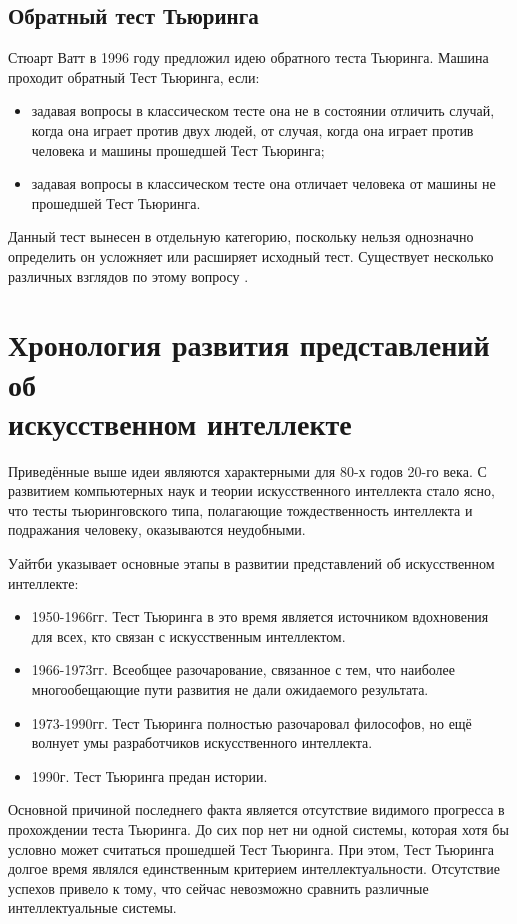 \documentclass[a4paper,14pt]{scrartcl}
\begin{document}
\subsection{Обратный тест Тьюринга}

Стюарт Ватт в 1996 году предложил идею обратного теста Тьюринга. Машина  проходит обратный Тест Тьюринга, если:
\begin{itemize}
  \item задавая вопросы в классическом тесте она не в состоянии отличить случай, когда она играет против двух людей, от случая, когда она играет против человека и машины прошедшей Тест Тьюринга;
  \item задавая вопросы в классическом тесте она отличает человека от машины не прошедшей Тест Тьюринга.
\end{itemize}

Данный тест вынесен в отдельную категорию, поскольку нельзя однозначно определить он усложняет или расширяет исходный тест. Существует несколько различных взглядов по этому вопросу \cite{sayagin_2000}.

\section{Хронология развития представлений об \\ искусственном интеллекте}

Приведённые выше идеи являются характерными для 80-х годов 20-го века. С развитием компьютерных наук и теории искусственного интеллекта стало ясно, что тесты тьюринговского типа, полагающие тождественность интеллекта и подражания человеку, оказываются неудобными. 

Уайтби \cite{whitby_1996} указывает основные этапы в развитии представлений об искусственном интеллекте:
\begin{itemize}
  \item 1950-1966гг. Тест Тьюринга в это время является источником вдохновения для всех, кто связан с искусственным интеллектом.
  \item 1966-1973гг. Всеобщее разочарование, связанное с тем, что наиболее многообещающие пути развития не дали ожидаемого результата.
  \item 1973-1990гг. Тест Тьюринга полностью разочаровал философов, но ещё волнует умы разработчиков искусственного интеллекта.
  \item 1990г. Тест Тьюринга предан истории.
\end{itemize}

Основной причиной последнего факта является отсутствие видимого прогресса в прохождении теста Тьюринга. До сих пор нет ни одной системы, которая хотя бы условно может считаться прошедшей Тест Тьюринга. При этом, Тест Тьюринга долгое время являлся единственным критерием интеллектуальности. Отсутствие успехов привело к тому, что сейчас невозможно сравнить различные интеллектуальные системы.
\end{document}
